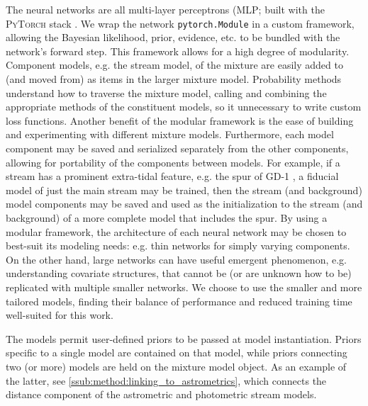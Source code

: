 \documentclass[twocolumn, linenumbers]{aastex631}
\newcommand{\code}[1]{\textsc{#1}}
\newcommand{\package}[1]{\code{#1}}
\newcommand{\stream}[1]{#1}
\begin{document}
        The neural networks are all multi-layer perceptrons (MLP; built with the
        \package{PyTorch} stack \citep{Pytorch2019}. We wrap the network
        \texttt{pytorch.Module} in a custom framework, allowing the Bayesian
        likelihood, prior, evidence, etc. to be bundled with the network's
        forward step. This framework allows for a high degree of modularity.
        Component models, e.g. the stream model, of the mixture are easily added
        to (and moved from) as items in the larger mixture model. Probability
        methods understand how to traverse the mixture model, calling and
        combining the appropriate methods of the constituent models, so it
        unnecessary to write custom loss functions.  Another benefit of the
        modular framework is the ease of building and experimenting with
        different mixture models. Furthermore, each model component may be saved
        and serialized separately from the other components, allowing for
        portability of the components between models.  For example, if a stream
        has a prominent extra-tidal feature, e.g. the spur of \stream{GD-1}
        \citep{Bonaca+2019}, a fiducial model of just the main stream may be
        trained, then the stream (and background) model components may be saved
        and used as the initialization to the stream (and background) of a more
        complete model that includes the spur.  By using a modular framework,
        the architecture of each neural network may be chosen to best-suit its
        modeling needs: e.g. thin networks for simply varying components.  On
        the other hand, large networks can have useful emergent phenomenon, e.g.
        understanding covariate structures, that cannot be (or are unknown how
        to be) replicated with multiple smaller networks. We choose to use the
        smaller and more tailored models, finding their balance of performance
        and reduced training time well-suited for this work.

        The models permit user-defined priors to be passed at model
        instantiation.  Priors specific to a single model are contained on that
        model, while priors connecting two (or more) models are held on the
        mixture model object. As an example of the latter, see
        \autoref{ssub:method:linking_to_astrometrics}, which connects the
        distance component of the astrometric and photometric stream models.
\end{document}
